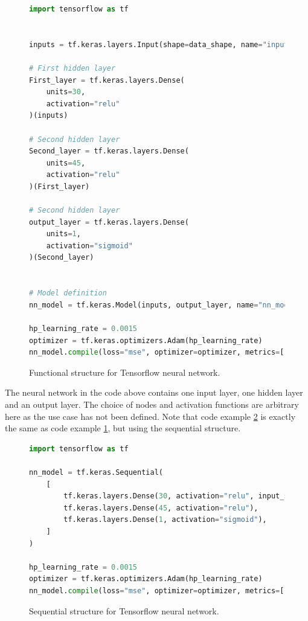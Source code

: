 \begin{figure}[h!]
    \centering
\begin{lstlisting}[language=Python, style=pythonstyle, label={code:python_func_example_general}]
import tensorflow as tf


inputs = tf.keras.layers.Input(shape=data_shape, name="input")

# First hidden layer
First_layer = tf.keras.layers.Dense(
    units=30,
    activation="relu"
)(inputs)

# Second hidden layer
Second_layer = tf.keras.layers.Dense(
    units=45, 
    activation="relu"
)(First_layer)

# Second hidden layer
output_layer = tf.keras.layers.Dense(
    units=1, 
    activation="sigmoid"
)(Second_layer)


# Model definition
nn_model = tf.keras.Model(inputs, output_layer, name="nn_model")

hp_learning_rate = 0.0015
optimizer = tf.keras.optimizers.Adam(hp_learning_rate)
nn_model.compile(loss="mse", optimizer=optimizer, metrics=["mse"]) 
\end{lstlisting}
\caption[Functional structure]{Functional structure for Tensorflow neural network.}
\label{code:functional}
\end{figure}
The neural network in the code above contains one input layer, one hidden layer and an output layer. The choice of nodes and activation functions are 
arbitrary here as the use case has not been defined. Note that code example \ref{code:sequatial} is exactly the same as code example \ref{code:functional},
but using the sequential structure.

\begin{figure}[h!]
    \centering
\begin{lstlisting}[language=Python, style=pythonstyle, label={code:python_seq_example}]
import tensorflow as tf

nn_model = tf.keras.Sequential(
    [
        tf.keras.layers.Dense(30, activation="relu", input_shape=data_shape),
        tf.keras.layers.Dense(45, activation="relu"),
        tf.keras.layers.Dense(1, activation="sigmoid"),
    ]
)

hp_learning_rate = 0.0015
optimizer = tf.keras.optimizers.Adam(hp_learning_rate)
nn_model.compile(loss="mse", optimizer=optimizer, metrics=["mse"]) 
\end{lstlisting}
\caption[Sequential structure]{Sequential structure for Tensorflow neural network.}
\label{code:sequatial}
\end{figure}

